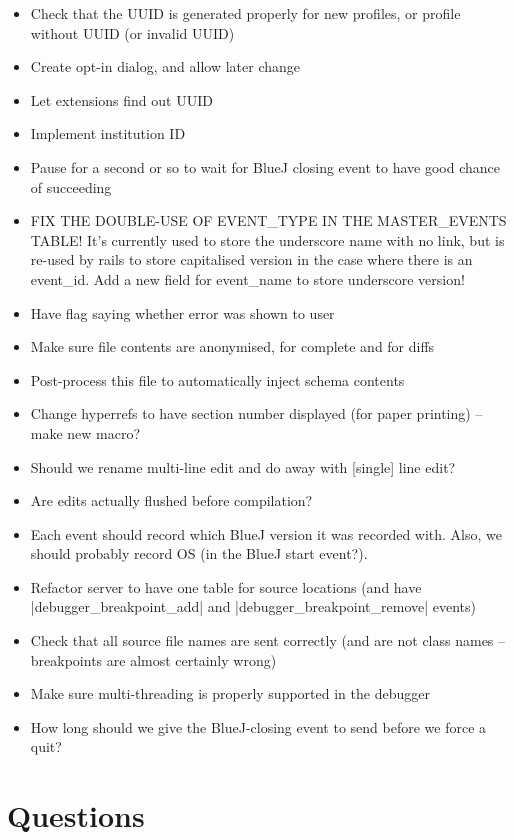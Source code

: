 \documentclass{book}
\begin{document}
\begin{itemize}
\item Check that the UUID is generated properly for new profiles, or profile without
UUID (or invalid UUID)
\item Create opt-in dialog, and allow later change
\item Let extensions find out UUID
\item Implement institution ID
\item Pause for a second or so to wait for BlueJ closing event to have good
  chance of succeeding
\item FIX THE DOUBLE-USE OF EVENT\_TYPE IN THE MASTER\_EVENTS TABLE!  It's
  currently used to store the underscore name with no link, but is re-used by
  rails to store capitalised version in the case where there is an event\_id.
  Add a new field for event\_name to store underscore version!
\item Have flag saying whether error was shown to user
\item Make sure file contents are anonymised, for complete and for diffs
\item Post-process this file to automatically inject schema contents
\item Change hyperrefs to have section number displayed (for paper printing)
  -- make new macro?
\item Should we rename multi-line edit and do away with [single] line edit?
\item Are edits actually flushed before compilation?
\item Each event should record which BlueJ version it was recorded with.
  Also, we should probably record OS (in the BlueJ start event?).
\item Refactor server to have one table for source locations (and have
  |debugger_breakpoint_add| and |debugger_breakpoint_remove| events)
\item Check that all source file names are sent correctly (and are not class
  names -- breakpoints are almost certainly wrong)
\item Make sure multi-threading is properly supported in the debugger
\item How long should we give the BlueJ-closing event to send before we force a
quit?
\end{itemize}

\section{Questions}
\end{document}
